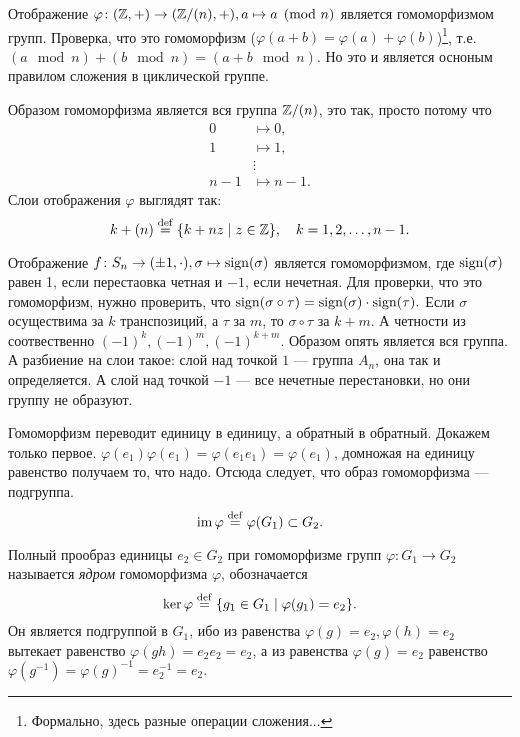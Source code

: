 \begin{example}
    Отображение $\varphi \colon (\mathbb Z, +) \to (\mathbb Z/(n), +), a \mapsto a \pmod n$ является гомоморфизмом групп. Проверка, что это гомоморфизм ($\varphi(a+b) = \varphi(a) + \varphi(b)$)\footnote{Формально, здесь разные операции сложения...}, т.е. $(a \mod n) + (b \mod n) = (a+b \mod n)$. Но это и является осноным правилом сложения в циклической группе.

    Образом гомоморфизма является вся группа $\mathbb Z/(n)$, это так, просто потому что \[
        \begin{aligned}
            0 &\mapsto 0, \\
            1 &\mapsto 1, \\
              &\vdots \\
            n-1 &\mapsto n-1.
        \end{aligned}
    \]
    Слои отображения $\varphi$ выглядят так: $$k + (n) \overset{\footnotesize{\mathrm{def}}}{=} \{k + nz\mid z \in \mathbb Z\}, \quad k = 1, 2, \ldots, n-1.$$
\end{example}
\begin{example}
    Отображение $f \colon S_n \to (\pm 1, \cdot), \sigma \mapsto  \operatorname{sign}(\sigma)$ является гомоморфизмом, где $\operatorname{sign}(\sigma)$ равен 1, если перестаовка четная и $-1$, если нечетная. Для проверки, что это гомоморфизм, нужно проверить, что $\operatorname{sign}(\sigma \circ \tau) = \operatorname{sign}(\sigma) \cdot \operatorname{sign}(\tau).$ Если $\sigma$ осуществима за $k$ транспозиций, а $\tau$ за $m$, то $\sigma \circ \tau$ за $k+m$. А четности из соотвественно $(-1)^k, (-1)^m, (-1)^{k+m}$.
    Образом опять является вся группа. А разбиение на слои такое: слой над точкой $1$ --- группа $A_n$, она так и определяется. А слой над точкой $-1$ --- все нечетные перестановки, но они группу не образуют.
\end{example}

Гомоморфизм переводит единицу в единицу, а обратный в обратный. Докажем только первое. \(\varphi(e_1)\varphi(e_1) = \varphi(e_1e_1)=\varphi(e_1)\), домножая на единицу равенство получаем то, что надо. Отсюда следует, что образ гомоморфизма --- подгруппа. \[\operatorname{im} \varphi \overset{\footnotesize{\mathrm{def}}}{=} \varphi(G_1) \subset G_2.\]

\begin{definition}
    Полный прообраз единицы $e_2 \in G_2$ при гомоморфизме групп $\varphi \colon G_1 \to G_2$ называется \emph{ядром} гомоморфизма $\varphi$, обозначается \[\ker \varphi \overset{\footnotesize{\mathrm{def}}}{=} \{g_1 \in G_1 \mid \varphi(g_1) = e_2 \}.\] Он является подгруппой в $G_1$, ибо из равенства \(\varphi(g) = e_2, \varphi(h) = e_2\) вытекает равенство $\varphi(gh) = e_2e_2 = e_2$, а из равенства $\varphi(g) = e_2$ равенство $\varphi(g^{-1}) = \varphi(g)^{-1} = e_2^{-1} = e_2.$ 
\end{definition}

